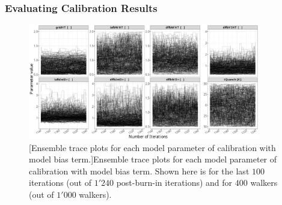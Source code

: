 \subsubsection{Evaluating Calibration Results}\label{subsub:bc_calibration_evaluation}







% 

% 

% 

\clearpage
\begin{figure}
	\centering
	\includegraphics[width=0.90\textwidth]{../figures/chapter5/figures/plotEnsTraceDiscAllCentered}
		[Ensemble trace plots for each model parameter of calibration with model bias term.]{Ensemble trace plots for each model parameter of calibration with model bias term. Shown here is for the last $100$ iterations (out of $1'240$ post-burn-in iterations) and for $400$ walkers (out of $1'000$ walkers).}
	\label{fig:ch5_plot_ens_trace_all_disc_centered}
\end{figure}
\clearpage